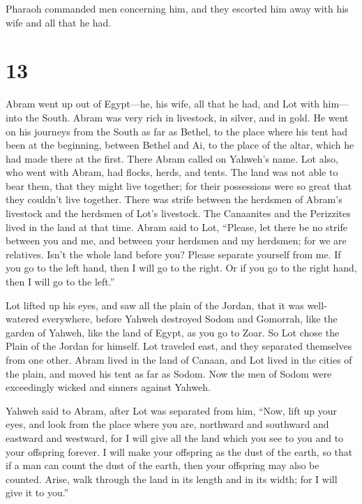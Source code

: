  Pharaoh commanded men concerning him, and they escorted
him away with his wife and all that he had.

\hypertarget{section-12}{%
\section{13}\label{section-12}}

 Abram went up out of Egypt---he, his wife, all that he
had, and Lot with him---into the South.  Abram was very
rich in livestock, in silver, and in gold.  He went on his
journeys from the South as far as Bethel, to the place where his tent
had been at the beginning, between Bethel and Ai,  to the
place of the altar, which he had made there at the first. There Abram
called on Yahweh's name.  Lot also, who went with Abram,
had flocks, herds, and tents.  The land was not able to
bear them, that they might live together; for their possessions were so
great that they couldn't live together.  There was strife
between the herdsmen of Abram's livestock and the herdsmen of Lot's
livestock. The Canaanites and the Perizzites lived in the land at that
time.  Abram said to Lot, ``Please, let there be no strife
between you and me, and between your herdsmen and my herdsmen; for we
are relatives.  Isn't the whole land before you? Please
separate yourself from me. If you go to the left hand, then I will go to
the right. Or if you go to the right hand, then I will go to the left.''

 Lot lifted up his eyes, and saw all the plain of the
Jordan, that it was well-watered everywhere, before Yahweh destroyed
Sodom and Gomorrah, like the garden of Yahweh, like the land of Egypt,
as you go to Zoar.  So Lot chose the Plain of the Jordan
for himself. Lot traveled east, and they separated themselves from one
other.  Abram lived in the land of Canaan, and Lot lived
in the cities of the plain, and moved his tent as far as Sodom.
 Now the men of Sodom were exceedingly wicked and sinners
against Yahweh.

 Yahweh said to Abram, after Lot was separated from him,
``Now, lift up your eyes, and look from the place where you are,
northward and southward and eastward and westward,  for I
will give all the land which you see to you and to your offspring
forever.  I will make your offspring as the dust of the
earth, so that if a man can count the dust of the earth, then your
offspring may also be counted.  Arise, walk through the
land in its length and in its width; for I will give it to you.''


